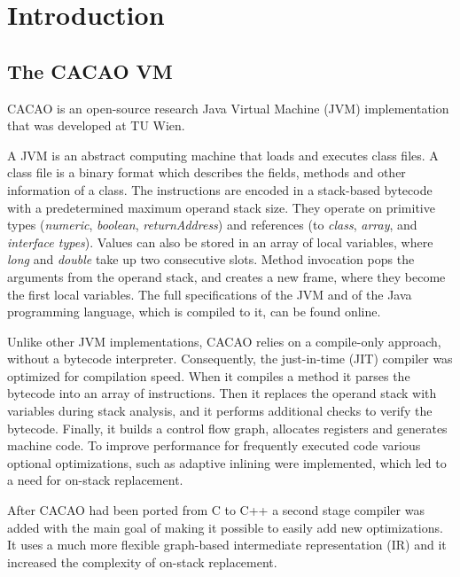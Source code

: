 \documentclass[draft,final]{vutinfth} %
\begin{document}
    \mainmatter


    \chapter{Introduction}


    \section{The CACAO VM}

    CACAO is an open-source research Java Virtual Machine (JVM) implementation
    that was developed at TU Wien.\cite{cacao-homepage,cacao-repo,cacao-64bit-jit}

    A JVM is an abstract computing machine that loads and executes class files.
    A class file is a binary format which describes the fields, methods and other information of a class.
    The instructions are encoded in a stack-based bytecode with a predetermined maximum operand stack size.
    They operate on primitive types (\emph{numeric}, \emph{boolean}, \emph{returnAddress}) and references (to \emph{class}, \emph{array}, and \emph{interface types}).
    Values can also be stored in an array of local variables,
    where \emph{long} and \emph{double} take up two consecutive slots.
    Method invocation pops the arguments from the operand stack,
    and creates a new frame, where they become the first local variables.
    The full specifications of the JVM and of the Java programming language, which is compiled to it, can be found online\cite{JavaSE}.

    Unlike other JVM implementations,
    CACAO relies on a compile-only approach, without a bytecode interpreter.
    Consequently, the just-in-time (JIT) compiler was optimized for compilation speed.
    When it compiles a method it parses the bytecode into an array of instructions.
    Then it replaces the operand stack with variables during stack analysis,
    and it performs additional checks to verify the bytecode.
    Finally, it builds a control flow graph, allocates registers and generates machine code.
    To improve performance for frequently executed code various optional optimizations,
    such as adaptive inlining were implemented,
    which led to a need for on-stack replacement\cite{10.1145/1294325.1294356}.

    After CACAO had been ported from C to C++ a second stage compiler\cite{EislJosef2013Offt} was added
    with the main goal of making it possible to easily add new optimizations.
    It uses a much more flexible graph-based intermediate representation (IR)
    and it increased the complexity of on-stack replacement.
\end{document}
